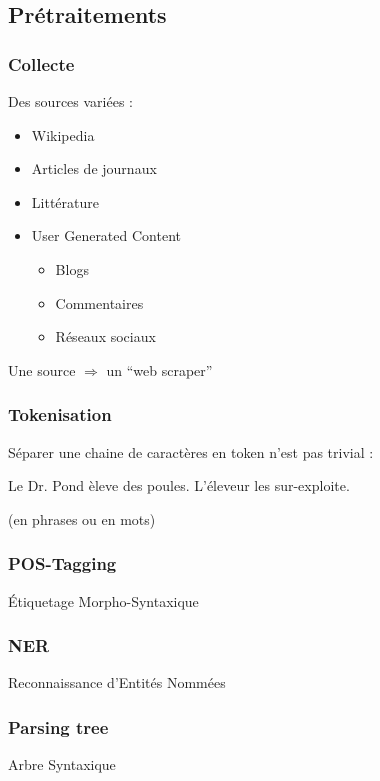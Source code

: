 \subsection{Prétraitements}



\begin{frame}
  \frametitle{Collecte}
  Des sources variées :
  \begin{itemize}
  \item Wikipedia
  \item Articles de journaux
  \item Littérature
  \item User Generated Content
    \begin{itemize}
    \item Blogs
    \item Commentaires
    \item Réseaux sociaux
    \end{itemize}
  \end{itemize}
  Une source $\Rightarrow$ un ``web scraper''
\end{frame}

\begin{frame}
  \frametitle{Tokenisation}
  Séparer une chaine de caractères en token n'est pas trivial : \\
  \newline
  \begin{center}
    Le Dr. Pond èleve des poules. L'éleveur les sur-exploite.
  \end{center}
  $\;$ \\
  (en phrases ou en mots)
\end{frame}

\begin{frame}
  \frametitle{POS-Tagging}
  Étiquetage Morpho-Syntaxique
\end{frame}

\begin{frame}
  \frametitle{NER}
  Reconnaissance d'Entités Nommées
\end{frame}

\begin{frame}
  \frametitle{Parsing tree}
  Arbre Syntaxique
\end{frame}

